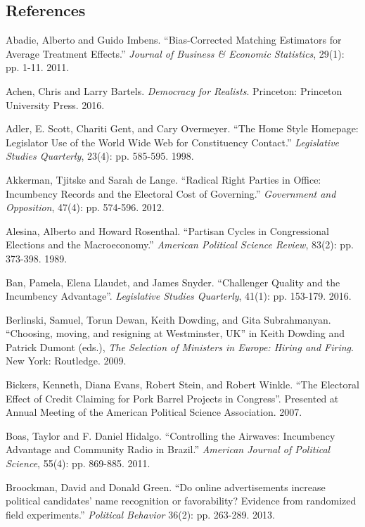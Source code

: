 \documentclass[letter,12pt]{article}
\begin{document}
\subsection*{References}
\begin{hangparas}{.25in}{1}
Abadie, Alberto and Guido Imbens. ``Bias-Corrected Matching Estimators for Average Treatment Effects.'' \textit{Journal of Business \& Economic Statistics}, 29(1): pp. 1-11. 2011.

Achen, Chris and Larry Bartels. \textit{Democracy for Realists}. Princeton: Princeton University Press. 2016.

Adler, E. Scott, Chariti Gent, and Cary Overmeyer. ``The Home Style Homepage: Legislator Use of the World Wide Web for Constituency Contact.'' \textit{Legislative Studies Quarterly}, 23(4): pp. 585-595. 1998.

Akkerman, Tjitske and Sarah de Lange. ``Radical Right Parties in Office: Incumbency Records and the Electoral Cost of Governing.'' \textit{Government and Opposition}, 47(4): pp. 574-596. 2012.

Alesina, Alberto and Howard Rosenthal. ``Partisan Cycles in Congressional Elections and the Macroeconomy.'' \textit{American Political Science Review}, 83(2): pp. 373-398. 1989.

Ban, Pamela, Elena Llaudet, and James Snyder. ``Challenger Quality and the Incumbency Advantage''. \textit{Legislative Studies Quarterly}, 41(1): pp. 153-179. 2016.

Berlinski, Samuel, Torun Dewan, Keith Dowding, and Gita Subrahmanyan. ``Choosing, moving, and resigning at Westminster, UK'' in Keith Dowding and Patrick Dumont (eds.), \textit{The Selection of Ministers in Europe: Hiring and Firing}. New York: Routledge. 2009.

Bickers, Kenneth, Diana Evans, Robert Stein, and Robert Winkle. ``The Electoral Effect of Credit Claiming for Pork Barrel Projects in Congress''. Presented at Annual Meeting of the American Political Science Association. 2007.

Boas, Taylor and F. Daniel Hidalgo. ``Controlling the Airwaves: Incumbency Advantage and Community Radio in Brazil.'' \textit{American Journal of Political Science}, 55(4): pp. 869-885. 2011.

Broockman, David and Donald Green. ``Do online advertisements increase political candidates' name recognition or favorability? Evidence from randomized field experiments.'' \textit{Political Behavior} 36(2): pp. 263-289. 2013.


\end{hangparas}
\end{document}
